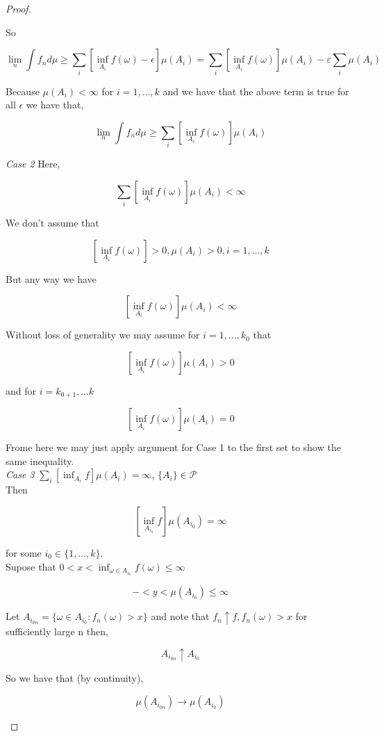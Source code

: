 \documentclass[11pt,fleqn]{book} %
\begin{document}
\begin{proof}
\begin{enumerate}
						So 

								$$\lim_n \int f_n d\mu \geq \sum_i [\inf_{A_{i}} f(\omega) - \epsilon] \mu(A_{i}) = \sum_i [\inf_{A_{i}} f(\omega)] \mu(A_{i}) - \varepsilon \sum_i \mu(A_i)$$

						Because $\mu(A_i) < \infty$ for $i = 1, \dots, k$ and we have that the above term is true for all $\epsilon$ we have that, 

								$$\lim_n \int f_n d\mu \geq \sum_i [\inf_{A_{i}} f(\omega)] \mu(A_{i}) $$
				
				\textit{Case 2}	Here, 

						$$  \sum_i [\inf_{A_i} f(\omega)] \mu(A_i) < \infty$$

				We don't assume that

						$$ [\inf_{A_i} f(\omega)] > 0, \mu({A_i}) > 0, i = 1, \dots, k $$	

				But any way we have

						$$[\inf_{A_i} f(\omega)] \mu(A_i) < \infty $$

				Without loss of generality we may assume for $i = 1, \dots, k_0$ that

						$$[\inf_{A_i} f(\omega)] \mu(A_i) > 0 $$

				and for $i = k_{0 + 1}, \dots k$

						$$[\inf_{A_i} f(\omega)] \mu(A_i) = 0 $$

				Frome here we may just apply argument for Case 1 to the first set to show the same inequality. \\

				\textit{Case 3} $\sum_i [\inf_{A_i} f] \mu(A_i) = \infty$, $\{A_i\} \in \mathcal{P}$\\

				Then

						$$[\inf_{A_{i_0}} f] \mu (A_{i_0}) = \infty $$

				for some $i_0 \in \{1, \dots, k\}$.\\

				Supose that $0 < x < \inf_{\omega \in A_{i_0}} f(\omega) \leq \infty$

						$$- < y < \mu(A_{i_0}) \leq \infty $$

				Let $A_{i_{0n}} = \{\omega\in A_{i_0}: f_n(\omega) > x\}$ and note that $f_n \uparrow f, f_n(\omega) > x$ for sufficiently large n then, 

						$$A_{i_{0n}} \uparrow A_{i_0} $$

				So we have that (by continuity),

						$$\mu(A_{i_{0n}}) \rightarrow \mu(A_{i_0}) $$


\end{enumerate}
\end{proof}
\end{document}
